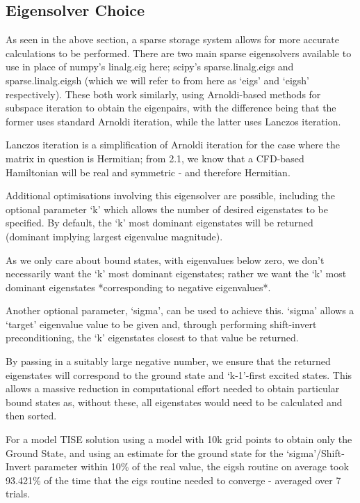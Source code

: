 \subsection{Eigensolver Choice}
As seen in the above section, a sparse storage system allows for more accurate calculations to be performed. There are two main sparse eigensolvers available to use in place of numpy's linalg.eig here; scipy's sparse.linalg.eigs and sparse.linalg.eigsh (which we will refer to from here as `eigs' and `eigsh' respectively). These both work similarly, using Arnoldi-based methods for subspace iteration to obtain the eigenpairs, with the difference being that the former uses standard Arnoldi iteration, while the latter uses Lanczos iteration\cite{scipy}. 

Lanczos iteration is a simplification of Arnoldi iteration for the case where the matrix in question is Hermitian; from 2.1, we know that a CFD-based Hamiltonian will be real and symmetric - and therefore Hermitian. 

Additional optimisations involving this eigensolver are possible, including the optional parameter `k' which allows the number of desired eigenstates to be specified. By default, the `k' most dominant eigenstates will be returned (dominant implying largest eigenvalue magnitude). 

As we only care about bound states, with eigenvalues below zero, we don't necessarily want the `k' most dominant eigenstates; rather we want the `k' most dominant eigenstates *corresponding to negative eigenvalues*. 

Another optional parameter, `sigma', can be used to achieve this. `sigma' allows a `target' eigenvalue value to be given and, through performing shift-invert preconditioning\cite{L3}, the `k' eigenstates closest to that value be returned. 

By passing in a suitably large negative number, we ensure that the returned eigenstates will correspond to the ground state and `k-1'-first excited states. This allows a massive reduction in computational effort needed to obtain particular bound states as, without these, all eigenstates would need to be calculated and then sorted. 

For a model TISE solution using a model with 10k grid points to obtain only the Ground State, and using an estimate for the ground state for the `sigma'/Shift-Invert parameter within 10\% of the real value, the eigsh routine on average took 93.421\% of the time that the eigs routine needed to converge - averaged over 7 trials. 

